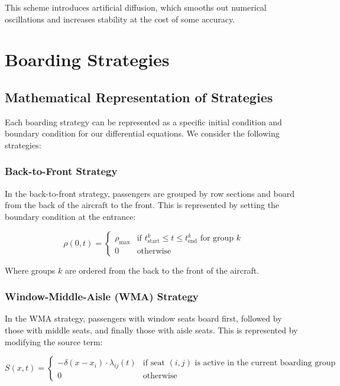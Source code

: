 \documentclass[a4paper,12pt]{article}
\begin{document}
This scheme introduces artificial diffusion, which smooths out numerical oscillations and increases stability at the cost of some accuracy.

\section{Boarding Strategies}

\subsection{Mathematical Representation of Strategies}

Each boarding strategy can be represented as a specific initial condition and boundary condition for our differential equations. We consider the following strategies:

\subsubsection{Back-to-Front Strategy}

In the back-to-front strategy, passengers are grouped by row sections and board from the back of the aircraft to the front. This is represented by setting the boundary condition at the entrance:

\begin{equation}
\rho(0,t) = 
\begin{cases}
\rho_{\text{max}} & \text{if } t_{\text{start}}^k \leq t \leq t_{\text{end}}^k \text{ for group } k \\
0 & \text{otherwise}
\end{cases}
\end{equation}

Where groups $k$ are ordered from the back to the front of the aircraft.

\subsubsection{Window-Middle-Aisle (WMA) Strategy}

In the WMA strategy, passengers with window seats board first, followed by those with middle seats, and finally those with aisle seats. This is represented by modifying the source term:

\begin{equation}
S(x,t) = 
\begin{cases}
-\delta(x - x_i) \cdot \lambda_{ij}(t) & \text{if seat } (i,j) \text{ is active in the current boarding group} \\
0 & \text{otherwise}
\end{cases}
\end{equation}
\end{document}
